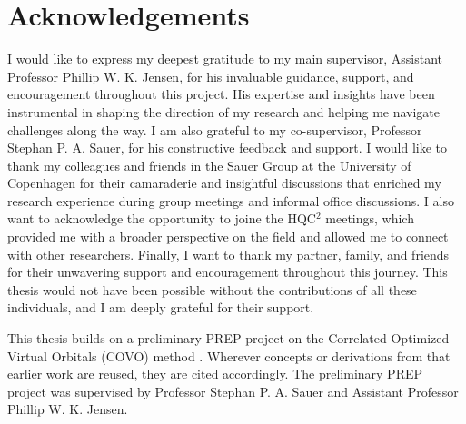 \chapter*{Acknowledgements}

\noindent

I would like to express my deepest gratitude to my main supervisor, Assistant Professor Phillip W. K. Jensen, for his invaluable guidance, support, and encouragement throughout this project. His expertise and insights have been instrumental in shaping the direction of my research and helping me navigate challenges along the way. I am also grateful to my co-supervisor, Professor Stephan P. A. Sauer, for his constructive feedback and support. I would like to thank my colleagues and friends in the Sauer Group at the University of Copenhagen for their camaraderie and insightful discussions that enriched my research experience during group meetings and informal office discussions. I also want to acknowledge the opportunity to joine the HQC$^2$ meetings, which provided me with a broader perspective on the field and allowed me to connect with other researchers. Finally, I want to thank my partner, family, and friends for their unwavering support and encouragement throughout this journey. This thesis would not have been possible without the contributions of all these individuals, and I am deeply grateful for their support.

\bigskip

This thesis builds on a preliminary PREP project on the Correlated Optimized Virtual Orbitals (COVO) method \cite{T}. Wherever concepts or derivations from that earlier work are reused, they are cited accordingly. The preliminary PREP project was supervised by Professor Stephan P. A. Sauer and Assistant Professor Phillip W. K. Jensen.